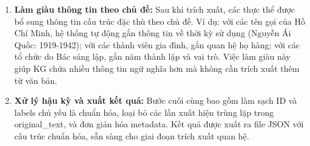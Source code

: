 \begin{enumerate}
    \item \textbf{Làm giàu thông tin theo chủ đề:} Sau khi trích xuất, các thực thể được bổ sung thông tin cấu trúc đặc thù theo chủ đề. Ví dụ: với các tên gọi của Hồ Chí Minh, hệ thống tự động gắn thông tin về thời kỳ sử dụng (Nguyễn Ái Quốc: 1919-1942); với các thành viên gia đình, gắn quan hệ họ hàng; với các tổ chức do Bác sáng lập, gắn năm thành lập và vai trò. Việc làm giàu này giúp KG chứa nhiều thông tin ngữ nghĩa hơn mà không cần trích xuất thêm từ văn bản.

    \item \textbf{Xử lý hậu kỳ và xuất kết quả:} Bước cuối cùng bao gồm làm sạch ID và labels chủ yếu là chuẩn hóa, loại bỏ các lần xuất hiện trùng lặp trong original\_text, và đơn giản hóa metadata. Kết quả được xuất ra file JSON với cấu trúc chuẩn hóa, sẵn sàng cho giai đoạn trích xuất quan hệ.
\end{enumerate}


